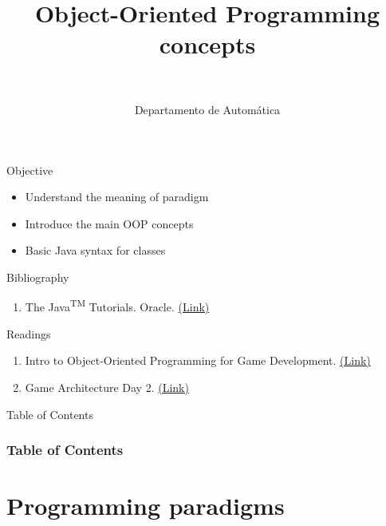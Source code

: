 \documentclass[10pt,compress]{beamer} %
\title[OOP concepts]{Object-Oriented Programming concepts}
\author{\asignatura\\\carrera}
\institute{}
\date{Departamento de Automática}
\begin{document}
{\titlepageBlue
    \begin{frame}
        \titlepage
    \end{frame}
}

\begin{frame}[plain]{}
   \begin{block}{Objective}
   \begin{itemize}
   		\item Understand the meaning of paradigm
   		\item Introduce the main OOP concepts
		\item Basic Java syntax for classes
	\end{itemize}
	\end{block}

   \begin{block}{Bibliography}
      \begin{enumerate}
          \item The Java\textsuperscript{TM} Tutorials. Oracle. \href{https://docs.oracle.com/javase/tutorial/}{(Link)}
      \end{enumerate} 
   \end{block}

   \begin{block}{Readings}
      \begin{enumerate}
          \item Intro to Object-Oriented Programming for Game Development. \href{https://gamedevelopment.tutsplus.com/tutorials/quick-tip-intro-to-object-oriented-programming-for-game-development--gamedev-1805}{(Link)}
          \item Game Architecture Day 2. \href{http://blog.nuclex-games.com/2010/01/game-architecture-day-2/}{(Link)}
      \end{enumerate} 
   \end{block}
\end{frame}

{
\begin{frame}[shrink]{Table of Contents}
 \frametitle{Table of Contents}
 \tableofcontents
\end{frame}
}

\section[Programming paradigms]{Programming paradigms}
\end{document}
